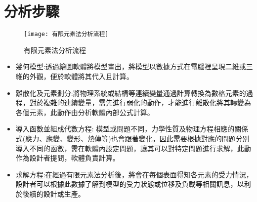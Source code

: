 \section{分析步驟}

\begin{figure}[hbt!]
\begin{center}
\texttt{[image: 有限元素法分析流程]}
\caption{\Large 有限元素法分析流程}\label{有限元素法分析流程}
\end{center}
\end{figure}

\begin{itemize}
\item 幾何模型:透過繪圖軟體將模型畫出，將模型以數據方式在電腦裡呈現二維或三維的外觀，便於軟體將其代入且計算。
\item 離散化及元素劃分:將物理系統或結構等連續變量通過計算轉換為數格元素的過程，對於複雜的連續變量，需先進行弱化的動作，才能進行離散化將其轉變為各個元素，此動作由分析軟體內部公式計算。
\item 導入函數並組成代數方程: 模型或問題不同，力學性質及物理方程相應的關係式(應力、應變、變形、熱傳等)也會跟著變化，因此需要根據對應的問題分別導入不同的函數，需在軟體內設定問題，讓其可以對特定問題進行求解，此動作為設計者提問，軟體負責計算。
\item 求解方程:在經過有限元素法分析後，將會在每個表面得知各元素的受力情況，設計者可以根據此數據了解到模型的受力狀態或位移及負載等相關訊息，以利於後續的設計或生產。
\end{itemize}
\newpage
